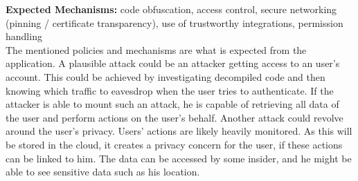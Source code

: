 \noindent\textbf{Expected Mechanisms:} code obfuscation, access control, secure networking (pinning / certificate transparency), use of trustworthy integrations, permission handling\\

The mentioned policies and mechanisms are what is expected from the application. A plausible attack could be an attacker getting access to an user's account. This could be achieved by investigating decompiled code and then knowing which traffic to eavesdrop when the user tries to authenticate. If the attacker is able to mount such an attack, he is capable of retrieving all data of the user and perform actions on the user's behalf. Another attack could revolve around the user's privacy. Users' actions are likely heavily monitored. As this will be stored in the cloud, it creates a privacy concern for the user, if these actions can be linked to him. The data can be accessed by some insider, and he might be able to see sensitive data such as his location.      

